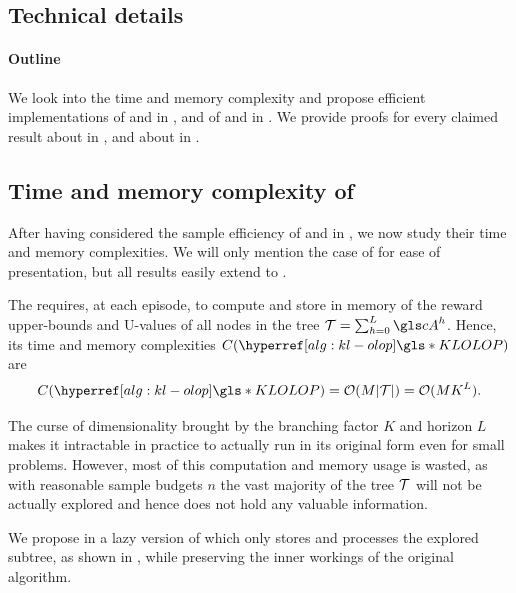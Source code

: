 \FloatBarrier
\begin{subappendices}
\section{Technical details}

\paragraph{Outline}
We look into the time and memory complexity and propose efficient implementations of \OLOP and \KLOLOP in , and of \GBOPD and \GBOP in . We provide proofs for every claimed result about \KLOLOP in , and about \GBOP in .

\subsection{Time and memory complexity of \KLOLOP}
\label{sec:kl-olop-time}

After having considered the sample efficiency of \OLOP and \KLOLOP in , we now study their time and memory complexities. We will only mention the case of \KLOLOP for ease of presentation, but all results easily extend to \OLOP.

The  requires, at each episode, to compute and store in memory of the reward upper-bounds and U-values of all nodes in the tree $\Tau = \sum_{h=0}^L \cA^h$.
Hence, its time and memory complexities $C(\KLOLOP)$ are 
\begin{equation*}
C(\KLOLOP) = \cO(M|\Tau|) = \cO(MK^L).
\end{equation*}

The curse of dimensionality brought by the branching factor $K$ and horizon $L$ makes it intractable in practice to actually run \KLOLOP in its original form even for small problems. However, most of this computation and memory usage is wasted, as with reasonable sample budgets $n$ the vast majority of the tree $\mathcal{T}$ will not be actually explored and hence does not hold any valuable information.

We propose in  a lazy version of \KLOLOP which only stores and processes the explored subtree, as shown in , while preserving the inner workings of the original algorithm.


\end{subappendices}

